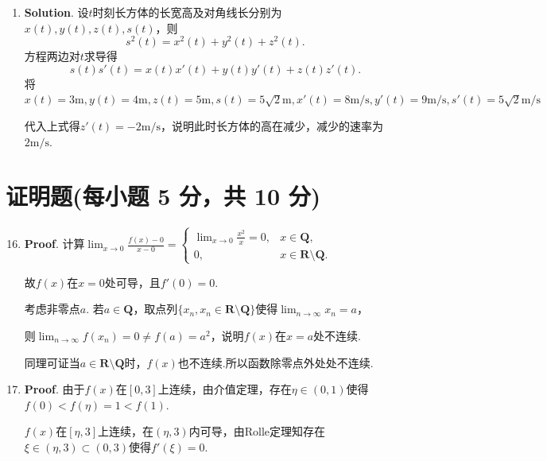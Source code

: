 \documentclass[../main.tex]{subfiles}
\begin{document}
\begin{enumerate}
          所以$u(x)$的主部为$\frac{1}{3}x^{3}$，阶数为3.

    \item \textbf{Solution}. 设$t$时刻长方体的长宽高及对角线长分别为$x(t),y(
              t),z(t),s(t)$，则
          \[
              s^{2}(t)=x^{2}(t)+y^{2}(t)+z^{2}(t).
          \]
          方程两边对$t$求导得
          \[
              s(t)s'(t)=x(t)x'(t)+y(t)y'(t)+z(t)z'(t).
          \]
          将$x(t)=3\mathrm{m},y(t)=4\mathrm{m},z(t)=5\mathrm{m},s(t)=5\sqrt{2}\mathrm{m}
              ,x'(t)=8\mathrm{m/s},y'(t)=9\mathrm{m/s},s'(t)=5\sqrt{2}\mathrm{m/s}$

          代入上式得$z'(t)=-2\mathrm{m/s}$，说明此时长方体的高在减少，减少的速率为$2\mathrm{m/s}$.
\end{enumerate}

\section{证明题(每小题 5 分，共 10 分)}
\begin{enumerate}
    \setcounter{enumi}{15}
    \item \textbf{Proof}. 计算$\lim_{x\to0}\frac{f(x)-0}{x-0}=
              \begin{cases}
                  \lim_{x\to0}\frac{x^2}{x}=0, & x\in\mathbf{Q},                    \\
                  0,                           & x\in\mathbf{R}\setminus\mathbf{Q}.
              \end{cases}$

          故$f(x)$在$x=0$处可导，且$f'(0)=0$.

          考虑非零点$a$. 若$a\in\mathbf{Q}$，取点列$\{x_{n},x_{n}\in\mathbf{R}\setminus
              \mathbf{Q}\}$使得$\lim_{n\to\infty}x_{n}=a$，

          则$\lim_{n\to\infty}f(x_{n})=0\neq f(a)=a^{2}$，说明$f(x)$在$x=a$处不连续.

          同理可证当$a\in\mathbf{R}\setminus\mathbf{Q}$时，$f(x)$也不连续.所以函数除零点外处处不连续.

    \item \textbf{Proof}. 由于$f(x)$在$[0,3]$上连续，由介值定理，存在$\eta\in
              (0,1)$使得$f(0)<f(\eta)=1<f(1)$.

          $f(x)$在$[\eta,3]$上连续，在$(\eta,3)$内可导，由Rolle定理知存在$\xi\in(\eta
              ,3)\subset(0,3)$使得$f'(\xi)=0$.
\end{enumerate}
\end{document}
